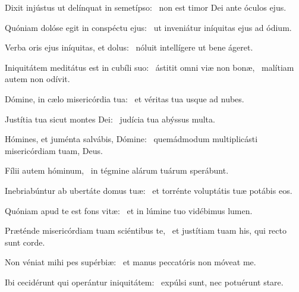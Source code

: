 \item Dixit injústus ut delínquat in semetípso:~\psstar{} non est timor Dei ante óculos ejus.

\item Quóniam dolóse egit in conspéctu ejus:~\psstar{} ut inveniátur iníquitas ejus ad ódium.

\item Verba oris ejus iníquitas, et dolus:~\psstar{} nóluit intellígere ut bene ágeret.

\item Iniquitátem meditátus est in cubíli suo:~\pscross{} ástitit omni viæ non bonæ,~\psstar{} malítiam autem non odívit.

\item Dómine, in cælo misericórdia tua:~\psstar{} et véritas tua usque ad nubes.

\item Justítia tua sicut montes Dei:~\psstar{} judícia tua abýssus multa.

\item Hómines, et juménta salvábis, Dómine:~\psstar{} quemádmodum multiplicásti misericórdiam tuam, Deus.

\item Fílii autem hóminum,~\psstar{} in tégmine alárum tuárum sperábunt.

\item Inebriabúntur ab ubertáte domus tuæ:~\psstar{} et torrénte voluptátis tuæ potábis eos.

\item Quóniam apud te est fons vitæ:~\psstar{} et in lúmine tuo vidébimus lumen.

\item Præténde misericórdiam tuam sciéntibus te,~\psstar{} et justítiam tuam his, qui recto sunt corde.

\item Non véniat mihi pes supérbiæ:~\psstar{} et manus peccatóris non móveat me.

\item Ibi cecidérunt qui operántur iniquitátem:~\psstar{} expúlsi sunt, nec potuérunt stare.
